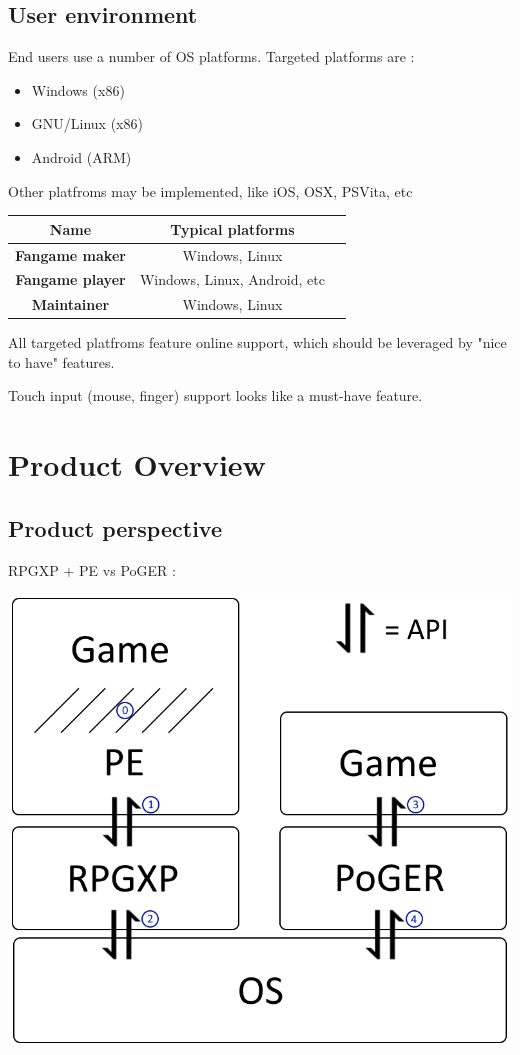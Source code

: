 \documentclass[11pt]{article}
\begin{document}
\subsection{User environment}

End users use a number of OS platforms. Targeted platforms are :
\begin{itemize}
	\item Windows (x86)
	\item GNU/Linux (x86)
	\item Android (ARM)
\end{itemize}
Other platfroms may be implemented, like iOS, OSX, PSVita, etc


\begin{center}
	\begin{tabular}{|C{0.2\hsize}|C{0.3\hsize}|C{0.36\hsize}|}
		\hline
		\textbf{Name} & \textbf{Typical platforms}  \\
		\hline
		\textbf{Fangame maker} & Windows, Linux \\
		\hline
		\textbf{Fangame player} & Windows, Linux, Android, etc \\
		\hline
		\textbf{Maintainer} & Windows, Linux \\
		\hline
	\end{tabular}
\end{center}

All targeted platfroms feature online support, which should be leveraged by "nice to have" features.

Touch input (mouse, finger) support looks like a must-have feature.







\newpage
\section{Product Overview}

\subsection{Product perspective}

RPGXP + PE vs PoGER : 
\begin{center}
	\includegraphics[width=.5\linewidth]{Dia001}
\end{center}
\end{document}
